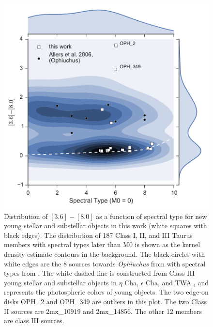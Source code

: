 \begin{figure}[ht!]
  \caption{ Distribution of $[3.6]-[8.0]$ as a function of spectral type for new young stellar and substellar objects in this work (white squares with black edges).  The distribution of 187 Class I, II, and III Taurus members with spectral types later than M0 \citep{2010ApJS..186..111L} is shown as the kernel density estimate contours in the background.  The black circles with white edges are the 8 sources towards \emph{Ophiuchus} from \citet{allers06} with spectral types from \citet{2011ASPC..448..633G}.  The white dashed line is constructed from Class III young stellar and substellar objects in $\eta$ Cha, $\epsilon$ Cha, and TWA \citep{2010ApJS..186..111L}, and represents the photospheric colors of young objects.  The two edge-on disks OPH\_2 and OPH\_349 are outliers in this plot.  The two Class II sources are 2mx\_10919 and 2mx\_14856.  The other 12 members are class III sources.  \label{fig_I1_I4_density} }
\centering
\includegraphics[scale=0.6]{chIMACS/figures/I1_I4_density.pdf}
\end{figure}


